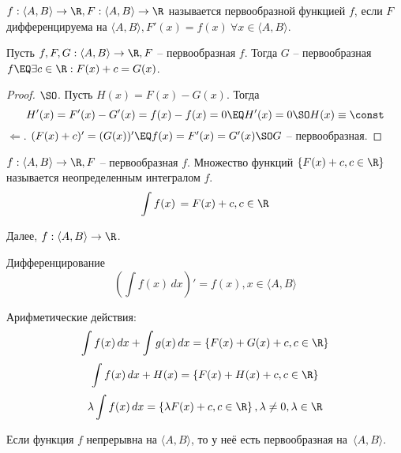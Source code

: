 



\Header

\BeginConspect


\begin{Def}
    $f : \langle A, B\rangle \to \R, F : \langle A, B\rangle \to \R$ называется первообразной функцией $f$, если $F$ дифференцируема на $\langle A, B\rangle, F'(x) = f(x) \ \forall x \in \langle A, B\rangle$.
\end{Def}

\begin{Thm}
    Пусть $f, F, G : \langle A, B\rangle \to \R, F$ -- первообразная $f$. Тогда
    $G$ -- первообразная $f \EQ \exists c \in \R : F(x) + c = G(x)$.
\end{Thm}

\begin{proof}
	$\SO$.  
    Пусть $H(x) = F(x) - G(x)$. Тогда
	\[H'(x) = F'(x) - G'(x) = f(x) - f(x) = 0 \EQ H'(x) = 0 \SO H(x) \equiv \const\]
    $\Leftarrow$. $(F(x) + c)' = (G(x))' \EQ f(x) = F'(x) = G'(x) \SO G$ -- первообразная.  
\end{proof}

\begin{Def}
    $f : \langle A, B\rangle \to \R, F$ -- первообразная $f$. Множество функций 
    $\{F(x) + c, c \in \R\}$ называется неопределенным интегралом $f$.
    \[\int f(x) \,  = F(x) + c, c \in \R \] 
\end{Def}

Далее, $f : \langle A, B\rangle \to \R$. 

\begin{MyList}
	\item Дифференцирование
	\[\left(\int f(x) \,dx\right)' = f(x), x \in \langle A, B\rangle\]

	\item Арифметические действия: 
	\[\int f(x) \,dx + \int g(x) \,dx = \left\{F(x) + G(x) + c, c \in \R\right\}\]
	\[\int f(x) \,dx + H(x) = \left\{F(x) + H(x) + c, c \in \R\right\}\]
	\[\lambda \int f(x) \,dx = \left\{\lambda F(x) + c, c \in \R\right\}, \lambda \neq 0, \lambda \in \R\]
\end{MyList}

\begin{Prop}
	Если функция $f$ непрерывна на $\langle A, B\rangle$, то у неё есть первообразная на~$\langle A, B\rangle$.
\end{Prop}

